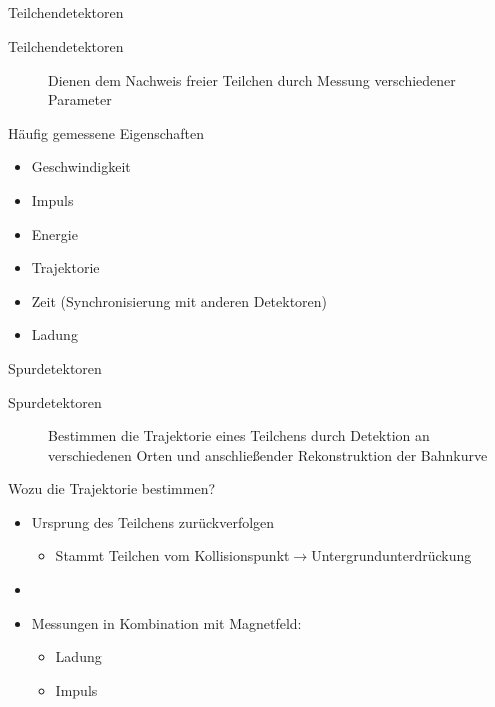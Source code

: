 
\subsection[]{}

\begin{frame}{Teilchendetektoren}
	\begin{description}
	  \item[Teilchendetektoren] Dienen dem Nachweis freier Teilchen durch Messung
	  verschiedener Parameter
	\end{description}
	
	\begin{block}{Häufig gemessene Eigenschaften}
		\begin{itemize}\setlength{\itemsep}{+5pt}
		  \item Geschwindigkeit
		  \item Impuls
		  \item Energie
		  \item Trajektorie
		  \item Zeit (Synchronisierung mit anderen Detektoren)
		  \item Ladung
		\end{itemize}
	\end{block}
\end{frame}


	\begin{frame}{Spurdetektoren}
	\begin{description}
	  \item[Spurdetektoren] Bestimmen die Trajektorie eines Teilchens durch
	  Detektion an verschiedenen Orten und anschließender Rekonstruktion der
	  Bahnkurve
	\end{description}
	\begin{block}{Wozu die Trajektorie bestimmen?}
		\begin{itemize}\setlength{\itemsep}{+5pt}
		  \item Ursprung des Teilchens zurückverfolgen
		  	\begin{itemize}\setlength{\itemsep}{+5pt}
		    	\item Stammt Teilchen vom
		    	Kollisionspunkt$\rightarrow$Untergrundunterdrückung
		  	\end{itemize}
		  	\item 
		  	\item Messungen in Kombination mit Magnetfeld:
		   		\begin{itemize}\setlength{\itemsep}{+5pt}
		    		\item Ladung
		    		\item Impuls
		  		\end{itemize}
		\end{itemize}
	\end{block}
\end{frame}


